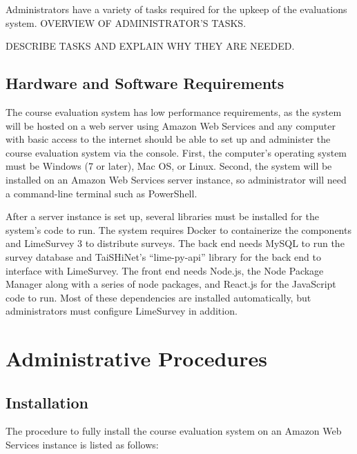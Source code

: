 \documentclass{article}
\begin{document}
Administrators have a variety of tasks required for the upkeep of the evaluations system. 
OVERVIEW OF ADMINISTRATOR'S TASKS.

DESCRIBE TASKS AND EXPLAIN WHY THEY ARE NEEDED.

\subsection{Hardware and Software Requirements}

The course evaluation system has low performance requirements, as the system will be hosted on a web server using Amazon Web Services and any computer with basic access to the internet should be able to set up and administer the course evaluation system via the console.  First, the computer's operating system must be Windows (7 or later), Mac OS, or Linux. Second, the system will be installed on an Amazon Web Services server instance, so administrator will need a command-line terminal such as PowerShell.

After a server instance is set up, several libraries must be installed for the system's code to run. The system requires Docker to containerize the components and LimeSurvey 3 to distribute surveys. The back end needs MySQL to run the survey database and TaiSHiNet's ``lime-py-api'' library for the back end to interface with LimeSurvey. The front end needs Node.js, the Node Package Manager along with a series of node packages, and React.js for the JavaScript code to run. Most of these dependencies are installed automatically, but administrators must configure LimeSurvey in addition.

\section{Administrative Procedures}

\subsection{Installation}

The procedure to fully install the course evaluation system on an Amazon Web Services instance is listed as follows:
\end{document}
